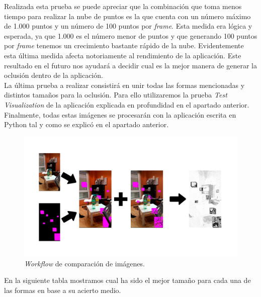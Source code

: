 Realizada esta prueba se puede apreciar que la combinación que toma menos tiempo para realizar la nube de puntos es la que cuenta con un número máximo de 1.000 puntos y un número de 100 puntos por \textit{frame}. Esta medida era lógica y esperada, ya que 1.000 es el número menor de puntos y que generando 100 puntos por \textit{frame} tenemos un crecimiento bastante rápido de la nube. Evidentemente esta última medida afecta notoriamente al rendimiento de la aplicación. Este resultado en el futuro nos ayudará a decidir cual es la mejor manera de generar la oclusión dentro de la aplicación.\\

La última prueba a realizar consistirá en unir todas las formas mencionadas y distintos tamaños para la oclusión. Para ello utilizaremos la prueba \textit{Test Visualization} de la aplicación explicada en profundidad en el apartado anterior.\\

Finalmente, todas estas imágenes se procesarán con la aplicación escrita en Python tal y como se explicó en el apartado anterior.\\

\begin{figure}[H]
    \centering
    \includegraphics[scale=0.2]{Images/NubeDePuntos/ComparacionImagenes.png}
    \caption[\textit{Workflow} de comparación de imágenes.]{\textit{Workflow} de comparación de imágenes.}
    \label{fig:AppUnity}
    \end{figure}

En la siguiente tabla mostramos cual ha sido el mejor tamaño para cada una de las formas en base a su acierto medio.\\

